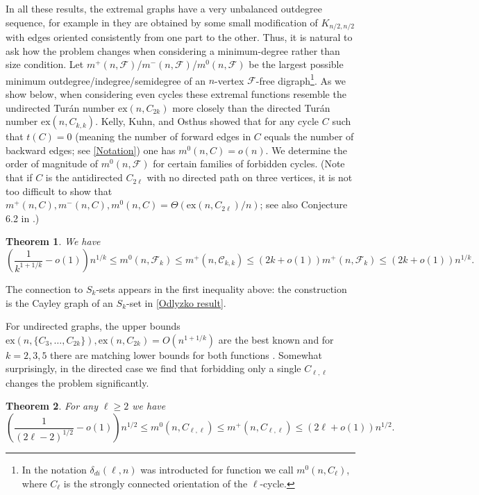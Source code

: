 \documentclass[12pt]{article}
\newtheorem{thm}{Theorem}
\begin{document}
In all these results, the extremal graphs have a very unbalanced outdegree sequence, for example in \cite{huang2024extremal} they are obtained by some small modification of $K_{n/2,n/2}$ with edges oriented consistently from one part to the other. Thus, it is natural to ask how the problem changes when considering a minimum-degree rather than size condition. Let $m^+(n,\mathcal F)$/$m^-(n,\mathcal F)$/$m^0(n,\mathcal F)$ be the largest possible minimum outdegree/indegree/semidegree of an $n$-vertex $\mathcal F$-free digraph\footnote{In \cite{kelly2010cycles} the notation $\delta_{di}(\ell,n)$ was introducted for function we call $m^0(n,C_\ell)$, where $C_\ell$ is the strongly connected orientation of the $\ell$-cycle.}. As we show below, when considering even cycles these extremal functions resemble the undirected Tur\'an number $\mathrm{ex}(n,C_{2k})$ more closely than the directed Tur\'an number $\mathrm{ex}(n,C_{k,k})$. Kelly, Kuhn, and Osthus \cite{kelly2010cycles} showed that for any cycle $C$ such that $t(C)=0$ (meaning the number of forward edges in $C$ equals the number of backward edges; see \autoref{Notation}) one has $m^0(n,C)=o(n)$. We determine the order of magnitude of $m^0(n,\mathcal F)$ for certain families of forbidden cycles. (Note that if $C$ is the antidirected $C_{2\ell}$ with no directed path on three vertices, it is not too difficult to show that $m^+(n,C),m^-(n,C),m^0(n,C)=\Theta(\mathrm{ex}(n,C_{2\ell})/n)$; see also Conjecture 6.2 in \cite{zhou2023turan}.)

\begin{thm} \label{Cll girth upper bound}
    We have
    $$\left(\frac{1}{k^{1+1/k}}-o(1)\right)n^{1/k}\le m^0(n,\mathcal F_k)\le m^+(n,\mathcal C_{k,k})\le(2k+o(1))m^+(n,\mathcal F_k)\le(2k+o(1))n^{1/k}.$$
\end{thm}

The connection to $S_k$-sets appears in the first inequality above: the construction is the Cayley graph of an $S_k$-set in \autoref{Odlyzko result}.

For undirected graphs, the upper bounds $\mathrm{ex}(n,\{C_3,\ldots,C_{2k}\}),\mathrm{ex}(n,C_{2k})=O(n^{1+1/k})$ \cite{bondy1974cycles} are the best known and for $k=2,3,5$ there are matching lower bounds for both functions \cite{furedi1996number,benson1966minimal}. Somewhat surprisingly, in the directed case we find that forbidding only a single $C_{\ell,\ell}$ changes the problem significantly.

\begin{thm} \label{Cll lower bound}
    For any $\ell\ge 2$ we have
    $$\left(\frac{1}{(2\ell-2)^{1/2}}-o(1)\right)n^{1/2}\le m^0(n,C_{\ell,\ell})\le m^+(n,C_{\ell,\ell})\le(2\ell+o(1))n^{1/2}.$$
\end{thm}
\end{document}
